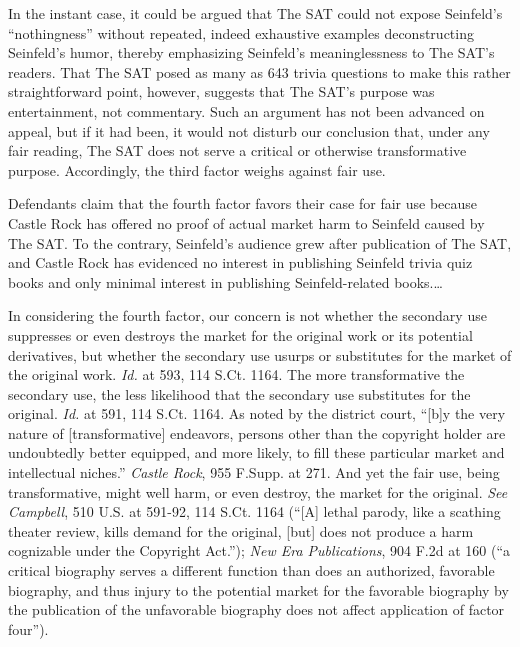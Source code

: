 In the instant case, it could be argued that The SAT could not expose Seinfeld's
``nothingness'' without repeated, indeed exhaustive examples deconstructing
Seinfeld's humor, thereby emphasizing Seinfeld's meaninglessness to The SAT's
readers. That The SAT posed as many as 643 trivia questions to make this rather
straightforward point, however, suggests that The SAT's purpose was
entertainment, not commentary. Such an argument has not been advanced on
appeal, but if it had been, it would not disturb our conclusion that, under any
fair reading, The SAT does not serve a critical or otherwise transformative
purpose. Accordingly, the third factor weighs against fair use.


Defendants claim that the fourth factor favors their case for fair use because
Castle Rock has offered no proof of actual market harm to Seinfeld caused by
The SAT. To the contrary, Seinfeld's audience grew after publication of The
SAT, and Castle Rock has evidenced no interest in publishing Seinfeld trivia
quiz books and only minimal interest in publishing Seinfeld-related books.\ldots

In considering the fourth factor, our concern is not whether the secondary use
suppresses or even destroys the market for the original work or its potential
derivatives, but whether the secondary use usurps or substitutes for the market
of the original work. \emph{Id.} at 593, 114 S.Ct. 1164. The more transformative
the
secondary use, the less likelihood that the secondary use substitutes for the
original. \emph{Id.} at 591, 114 S.Ct. 1164. As noted by the district court,
``[b]y
the very nature of [transformative] endeavors, persons other than the copyright
holder are undoubtedly better equipped, and more likely, to fill these
particular market and intellectual niches.'' \emph{Castle Rock}, 955 F.Supp. at
271.
And yet the fair use, being transformative, might well harm, or even destroy,
the market for the original. \emph{See} \emph{Campbell}, 510 U.S. at 591-92, 114
S.Ct. 1164
(``[A] lethal parody, like a scathing theater review, kills demand for the
original, [but] does not produce a harm cognizable under the Copyright Act.'');
\emph{New Era Publications}, 904 F.2d at 160 (``a critical biography serves a
different function than does an authorized, favorable biography, and thus
injury to the potential market for the favorable biography by the publication
of the unfavorable biography does not affect application of factor four'').

